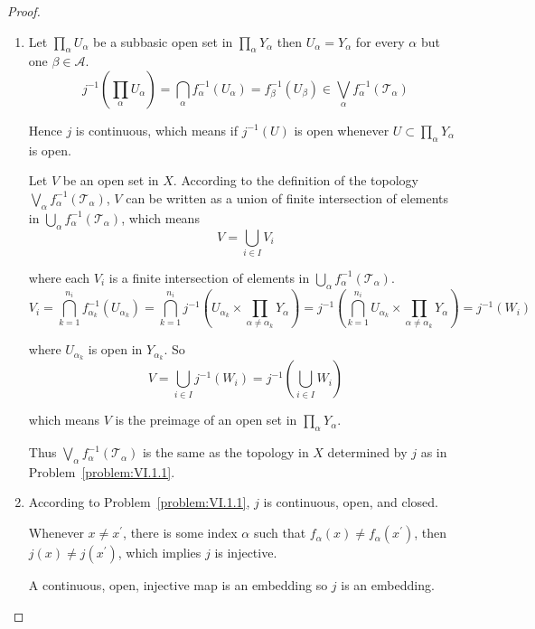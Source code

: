 \begin{proof}
	\begin{enumerate}[label={(\alph*)}]
		\item Let \( \prod_{\alpha} U_{\alpha} \) be a subbasic open set in \( \prod_{\alpha} Y_{\alpha} \) then \( U_{\alpha} = Y_{\alpha} \) for every \( \alpha \) but one \( \beta \in \mathscr{A} \).
		      \[
			      j^{-1}\left( \prod_{\alpha} U_{\alpha} \right) = \bigcap_{\alpha} f_{\alpha}^{-1}(U_{\alpha}) = f_{\beta}^{-1}(U_{\beta}) \in \bigvee_{\alpha} f_{\alpha}^{-1}(\mathscr{T}_{\alpha})
		      \]

		      Hence \( j \) is continuous, which means if \( j^{-1}(U) \) is open whenever \( U \subset \prod_{\alpha} Y_{\alpha} \) is open.

		      Let \( V \) be an open set in \( X \). According to the definition of the topology \( \bigvee_{\alpha} f_{\alpha}^{-1}(\mathscr{T}_{\alpha}) \), \( V \) can be written as a union of finite intersection of elements in \( \bigcup_{\alpha} f_{\alpha}^{-1}(\mathscr{T}_{\alpha}) \), which means
		      \[
			      V = \bigcup_{i\in I} V_{i}
		      \]

		      where each \( V_{i} \) is a finite intersection of elements in \( \bigcup_{\alpha} f_{\alpha}^{-1}(\mathscr{T}_{\alpha}) \).
		      \[
			      V_{i} = \bigcap^{n_{i}}_{k=1} f_{\alpha_{k}}^{-1}(U_{\alpha_{k}}) = \bigcap^{n_{i}}_{k=1} j^{-1}\left( U_{\alpha_{k}} \times \prod_{\alpha \ne \alpha_{k}} Y_{\alpha} \right) = j^{-1}\left( \bigcap^{n_{i}}_{k=1} U_{\alpha_{k}} \times \prod_{\alpha \ne \alpha_{k}} Y_{\alpha} \right) = j^{-1}(W_{i})
		      \]

		      where \( U_{\alpha_{k}} \) is open in \( Y_{\alpha_{k}} \). So
		      \[
			      V = \bigcup_{i\in I} j^{-1}(W_{i}) = j^{-1}\left( \bigcup_{i\in I} W_{i} \right)
		      \]

		      which means \( V \) is the preimage of an open set in \( \prod_{\alpha} Y_{\alpha} \).

		      Thus \( \bigvee_{\alpha} f_{\alpha}^{-1}(\mathscr{T}_{\alpha}) \) is the same as the topology in \( X \) determined by \( j \) as in Problem~\ref{problem:VI.1.1}.
		\item According to Problem~\ref{problem:VI.1.1}, \( j \) is continuous, open, and closed.

		      Whenever \( x \ne x^{\prime} \), there is some index \( \alpha \) such that \( f_{\alpha}(x) \ne f_{\alpha}(x^{\prime}) \), then \( j(x) \ne j(x^{\prime}) \), which implies \( j \) is injective.

		      A continuous, open, injective map is an embedding so \( j \) is an embedding.
	\end{enumerate}
\end{proof}

